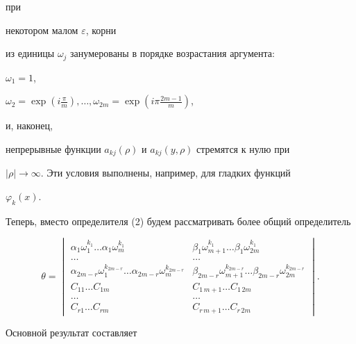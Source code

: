 при 


некотором малом $\varepsilon$, корни 


из единицы $\omega_j$ занумерованы в порядке возрастания аргумента: 


$\omega_1=1$, 


$\omega_2=\exp(i\frac{\pi}{m}),\dotsc,\omega_{2m}= 


\exp(i\pi\frac{2m-1}{m})$, 


и, наконец, 


непрерывные функции $a_{kj}(\rho)$ и $a_{kj}(y,\rho)$ стремятся к нулю при 


$|\rho|\to\infty$. Эти условия выполнены, например, для гладких функций 


$\varphi_k(x)$. 


 


Теперь, вместо определителя (2) будем рассматривать более общий определитель 


$$ 


\theta = 


\begin{vmatrix} 


\alpha_1\omega_1^{k_1}\dots \alpha_1\omega_m^{k_1} & 


\beta_1\omega_{m+1}^{k_1}\dots \beta_1\omega_{2m}^{k_1}\\ 


\dots & \dots\\




\alpha_{2m-r}\omega_1^{k_{2m-r}}\dots \alpha_{2m-r}\omega_m^{k_{2m-r}}& 


\beta_{2m-r}\omega_{m+1}^{k_{2m-r}}\dots\beta_{2m-r}\omega_{2m}^{k_{2m-r}}\\ 


C_{11}\dots C_{1m} & C_{1\,m+1}\dots C_{1\,2m}\\ 


\dots & \dots \\




C_{r1}\dots C_{rm} & C_{r\,m+1}\dots C_{r\,2m} 


\end{vmatrix} 


. 


$$ 


Основной результат составляет 



